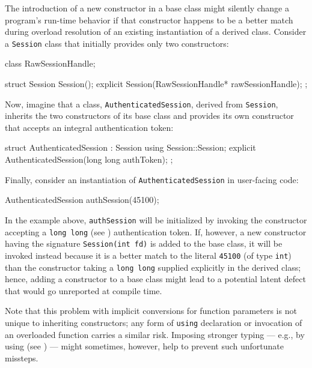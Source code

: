 The introduction of a new constructor in a base class might silently
change a program's run-time behavior if that constructor happens to be a
better match during overload resolution of an existing instantiation of
a derived class. Consider a \lstinline!Session! class that initially provides only two constructors:

\begin{emcppshiddenlisting}[emcppsbatch=e9]
class RawSessionHandle;
\end{emcppshiddenlisting}
\begin{emcppslisting}[emcppsbatch=e9]
struct Session
{
    Session();
    explicit Session(RawSessionHandle* rawSessionHandle);
};
\end{emcppslisting}
    
\noindent Now, imagine that a class, \lstinline!AuthenticatedSession!, derived from
\lstinline!Session!, inherits the two constructors of its base class and provides its own constructor that accepts an integral
authentication token:

\begin{emcppslisting}[emcppsbatch=e9]
struct AuthenticatedSession : Session
{
    using Session::Session;
    explicit AuthenticatedSession(long long authToken);
};
\end{emcppslisting}
    
\noindent Finally, consider an instantiation of \lstinline!AuthenticatedSession! in
user-facing code:

\begin{emcppslisting}[emcppsbatch=e9]
AuthenticatedSession authSession(45100);
\end{emcppslisting}
    
\noindent In the example above, \lstinline!authSession! will be initialized by
invoking the constructor accepting a \lstinline!long!~\lstinline!long! (see ) 
authentication token. If, however, a new
constructor having the signature \lstinline!Session(int!~\lstinline!fd)! is added to the
base class, it will be invoked instead because it is a better match to the
literal \lstinline!45100! (of type \lstinline!int!) than the constructor
taking a \lstinline!long!~\lstinline!long! supplied explicitly in the derived
class; hence, adding a constructor to a base class might lead to a
potential latent defect that would go unreported at compile
time.

Note that this problem with implicit conversions for function parameters is not unique
to inheriting constructors; any form of \lstinline!using! declaration or
invocation of an overloaded function carries a similar risk. Imposing
stronger typing --- e.g., by using  (see ) 
--- might sometimes, however, help to prevent such
unfortunate missteps.

